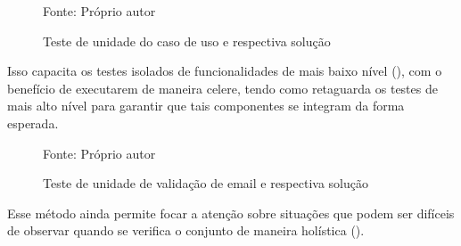   \begin{figure}[h]
    \centering
    \caption{Teste de unidade do caso de uso e respectiva solução}
    Fonte: Próprio autor
    \label{fig:teste-de-unidade-caso-de-uso}
  \end{figure}

  Isso capacita os testes isolados de funcionalidades de mais baixo nível (), com o benefício de executarem de maneira celere, tendo como retaguarda os testes de mais alto nível para garantir que tais componentes se integram da forma esperada.

  \begin{figure}[h]
    \centering
    \caption{Teste de unidade de validação de email e respectiva solução}
    Fonte: Próprio autor
    \label{fig:teste-de-unidade-email}
  \end{figure}

	Esse método ainda permite focar a atenção sobre situações que podem ser difíceis de observar quando se verifica o conjunto de maneira holística ().


